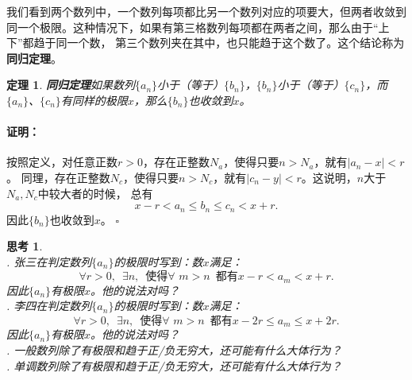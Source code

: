\documentclass[12pt,UTF8]{ctexbook}
\newtheorem{tm}{定理}[section]
\newtheorem{sk}{思考}[section]
\renewenvironment{proof}{\paragraph{\textbf{证明：}}}{\hfill$\square$}
\begin{document}
我们看到两个数列中，一个数列每项都比另一个数列对应的项要大，但两者收敛到同一个极限。这种情况下，如果有第三格数列每项都在两者之间，那么由于“上下”都趋于同一个数，
第三个数列夹在其中，也只能趋于这个数了。这个结论称为\textbf{同归定理}。
\begin{tm}{\textbf{同归定理}}\label{tm:a-0-48}
    如果数列$\{a_n\}$小于（等于）$\{b_n\}$，$\{b_n\}$小于（等于）$\{c_n\}$，而$\{a_n\}$、$\{c_n\}$有同样的极限$x$，那么$\{b_n\}$也收敛到$x$。
\end{tm}
\begin{proof}
    按照定义，对任意正数$r>0$，存在正整数$N_a$，使得只要$n>N_a$，就有$|a_n - x| < r$。
    同理，存在正整数$N_c$，使得只要$n>N_c$，就有$|c_n - y| < r$。这说明，$n$大于$N_a,N_c$中较大者的时候，
    总有
    $$ x - r < a_n \leqslant b_n \leqslant c_n < x + r. $$
    因此$\{b_n\}$也收敛到$x$。
\end{proof}

\begin{sk}
    \mbox{} \\
    . 张三在判定数列$\{a_n\}$的极限时写到：数$x$满足：
    $$ \forall r > 0, \,\,\, \exists n,  \,\,\, \mbox{使得} \forall \,\, m > n \,\,\, \mbox{都有} x - r < a_m < x + r. $$
    \indent 因此$\{a_n\}$有极限$x$。他的说法对吗？\\
    . 李四在判定数列$\{a_n\}$的极限时写到：数$x$满足：
    $$ \forall r > 0, \,\,\, \exists n,  \,\,\, \mbox{使得} \forall \,\, m > n \,\,\, \mbox{都有} x - 2r \leqslant a_m \leqslant x + 2r. $$
    \indent 因此$\{a_n\}$有极限$x$。他的说法对吗？\\
    . 一般数列除了有极限和趋于正/负无穷大，还可能有什么大体行为？\\
    . 单调数列除了有极限和趋于正/负无穷大，还可能有什么大体行为？
\end{sk}
\end{document}
